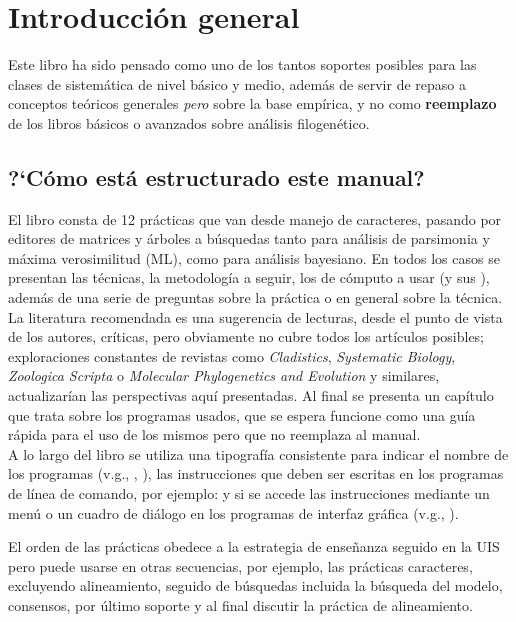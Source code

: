 
\chapter{Introducci\'on general}
Este libro ha sido pensado como uno de los tantos soportes posibles para las clases de sistem\'atica de nivel b\'asico y medio, adem\'as de servir de repaso a conceptos te\'oricos generales \textit{pero} sobre la base emp\'irica, y no como \textbf{reemplazo} de los 
libros b\'asicos o avanzados sobre an\'alisis filogen\'etico.
\section*{?`C\'omo est\'a estructurado este manual?}
El libro consta de 12 pr\'acticas que van desde manejo de caracteres, pasando por editores de matrices y \'arboles a b\'usquedas tanto para an\'alisis de parsimonia y m\'axima verosimilitud (ML), como para an\'alisis bayesiano. En todos los casos se presentan las t\'ecnicas, la metodolog\'ia a seguir, los  de c\'omputo a usar (y sus ), adem\'as de una serie de preguntas sobre la pr\'actica o en general sobre la t\'ecnica. La literatura recomendada es una sugerencia de lecturas, desde el punto de vista de los autores, cr\'iticas, pero obviamente no cubre todos los art\'iculos posibles; exploraciones constantes de revistas como \textit{Cladistics}, \textit{Systematic Biology}, \textit{Zoologica Scripta} o \textit{Molecular Phylogenetics and Evolution} y similares, actualizar\'ian las perspectivas aqu\'i presentadas. Al final se presenta un cap\'itulo que trata sobre los programas usados, que se espera funcione como una gu\'ia r\'apida para el uso de los mismos pero que no reemplaza al manual.\\
A lo largo del libro se utiliza una tipograf\'ia consistente para indicar el nombre de los programas (v.g., , ), las instrucciones que deben ser escritas en los programas de l\'inea de comando, por ejemplo: 
y si se accede las instrucciones mediante un men\'u o un cuadro de di\'alogo en los programas de interfaz gr\'afica (v.g., ).

El orden de las pr\'acticas obedece a la estrategia de ense\~nanza seguido en la UIS pero  puede usarse en otras secuencias, por ejemplo, las pr\'acticas caracteres, excluyendo alineamiento, seguido de b\'usquedas incluida la b\'usqueda del modelo, consensos, por \'ultimo soporte y al final discutir la pr\'actica de alineamiento.

